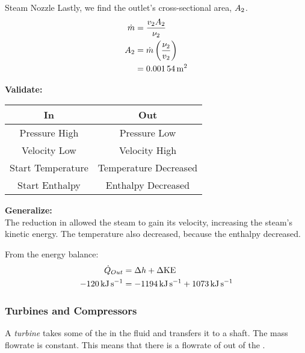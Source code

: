 \begin{example}{Steam Nozzle}
  Lastly, we find the outlet's cross-sectional area, $A_{2}$.
  \begin{align*}
    \dot{m} &= \frac{v_{2} A_{2}}{\nu_{2}} \\
    A_{2} &= \dot{m} \left( \frac{\nu_{2}}{v_{2}} \right) \\
                     &= \SI{0.00154}{\meter\squared} \\
  \end{align*}

  \textbf{Validate:} \\
  \begin{center}
    \begin{tabular}{c|c}
      \toprule
      In & Out \\
      \midrule
      Pressure High & Pressure Low \\
      Velocity Low & Velocity High \\
      Start Temperature & Temperature Decreased \\
      Start Enthalpy & Enthalpy Decreased \\
      \bottomrule
    \end{tabular}
  \end{center}

  \textbf{Generalize:} \\
  The reduction in  allowed the steam to gain its velocity, increasing the steam's kinetic energy.
  The temperature also decreased, because the enthalpy decreased.

  From the energy balance:
  \begin{align*}
    \dot{Q}_{Out} &= \Delta h + \Delta \mathrm{KE} \\
    \SI{-120}{\kilo\joule\per\second} &= \SI{-1194}{\kilo\joule\per\second} + \SI{1073}{\kilo\joule\per\second}
  \end{align*}
\end{example}

\subsubsection{Turbines and Compressors}\label{subsubsec:Turbines_Compressors}
\begin{definition}[Turbine]\label{def:Turbine}
  A \emph{turbine} takes some of the  in the fluid and transfers it to a shaft.
  The mass flowrate is constant.
  This means that there is a flowrate of  out of the .
\end{definition}

